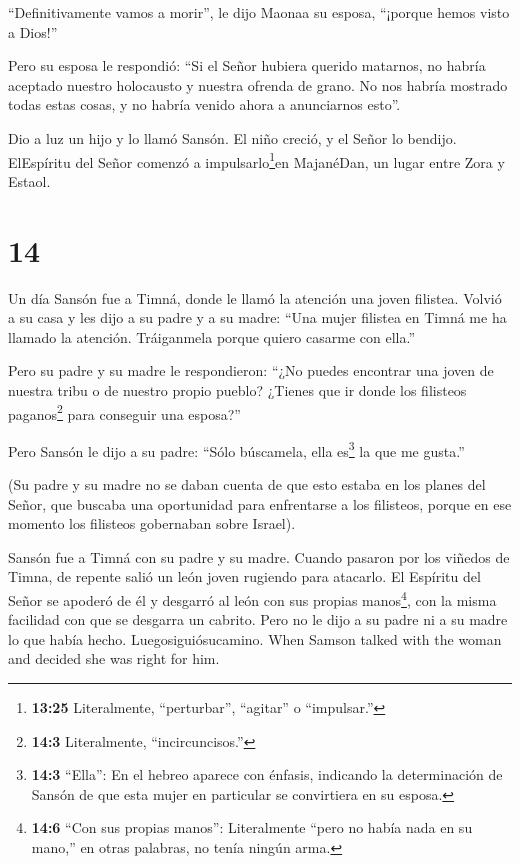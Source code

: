  ``Definitivamente vamos a morir'', le dijo Maonaa su
esposa, ``¡porque hemos visto a Dios!''

 Pero su esposa le respondió: ``Si el Señor hubiera querido
matarnos, no habría aceptado nuestro holocausto y nuestra ofrenda de
grano. No nos habría mostrado todas estas cosas, y no habría venido
ahora a anunciarnos esto''.

 Dio a luz un hijo y lo llamó Sansón. El niño creció, y el
Señor lo bendijo.  ElEspíritu del Señor comenzó a
impulsarlo\footnote{\textbf{13:25} Literalmente, ``perturbar'',
  ``agitar'' o ``impulsar.''}en MajanéDan, un lugar entre Zora y Estaol.

\hypertarget{section-13}{%
\section{14}\label{section-13}}

 Un día Sansón fue a Timná, donde le llamó la atención una
joven filistea.  Volvió a su casa y les dijo a su padre y a
su madre: ``Una mujer filistea en Timná me ha llamado la atención.
Tráiganmela porque quiero casarme con ella.''

 Pero su padre y su madre le respondieron: ``¿No puedes
encontrar una joven de nuestra tribu o de nuestro propio pueblo? ¿Tienes
que ir donde los filisteos paganos\footnote{\textbf{14:3} Literalmente,
  ``incircuncisos.''} para conseguir una esposa?''

Pero Sansón le dijo a su padre: ``Sólo búscamela, ella es\footnote{\textbf{14:3}
  ``Ella'': En el hebreo aparece con énfasis, indicando la determinación
  de Sansón de que esta mujer en particular se convirtiera en su esposa.}
la que me gusta.''

 (Su padre y su madre no se daban cuenta de que esto estaba
en los planes del Señor, que buscaba una oportunidad para enfrentarse a
los filisteos, porque en ese momento los filisteos gobernaban sobre
Israel).

 Sansón fue a Timná con su padre y su madre. Cuando pasaron
por los viñedos de Timna, de repente salió un león joven rugiendo para
atacarlo.  El Espíritu del Señor se apoderó de él y desgarró
al león con sus propias manos\footnote{\textbf{14:6} ``Con sus propias
  manos'': Literalmente ``pero no había nada en su mano,'' en otras
  palabras, no tenía ningún arma.}, con la misma facilidad con que se
desgarra un cabrito. Pero no le dijo a su padre ni a su madre lo que
había hecho. Luegosiguiósucamino.  When Samson talked with
the woman and decided she was right for him.

